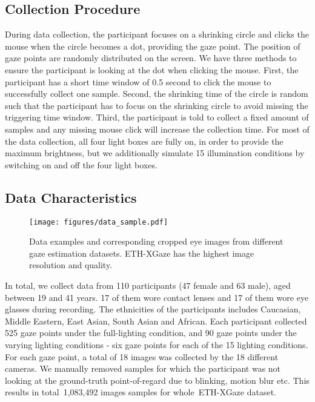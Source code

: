 \documentclass[runningheads]{llncs}
\newcommand{\datasetname}{ETH-XGaze\xspace}
\newcommand{\numsample}{1,083,492\xspace}
\begin{document}
\subsection{Collection Procedure}
During data collection, the participant focuses on a shrinking circle and clicks the mouse when the circle becomes a dot, providing the gaze point.
The position of gaze points are randomly distributed on the screen.
We have three methods to ensure the participant is looking at the dot when clicking the mouse.
First, the participant has a short time window of 0.5 second to click the mouse to successfully collect one sample.
Second, the shrinking time of the circle is random such that the participant has to focus on the shrinking circle to avoid missing the triggering time window.
Third, the participant is told to collect a fixed amount of samples and any missing mouse click will increase the collection time.
For most of the data collection, all four light boxes are fully on, in order to provide the maximum brightness, but we additionally simulate 15 illumination conditions by switching on and off the four light boxes.

\subsection{Data Characteristics}

\begin{figure}[t]
    \centering
    \texttt{[image: figures/data\_sample.pdf]}
    \caption{Data examples and corresponding cropped eye images from different gaze estimation datasets. \datasetname has the highest image resolution and quality.}
    \label{fig:data_sample}
\end{figure}

In total, we collect data from 110 participants (47 female and 63 male), aged between 19 and 41 years.
17 of them wore contact lenses and 17 of them wore eye glasses during recording.
The ethnicities of the participants includes Caucasian, Middle Eastern, East Asian, South Asian and African.
Each participant collected 525 gaze points under the full-lighting condition, and 90 gaze points under the varying lighting conditions - six gaze points for each of the 15 lighting conditions.
For each gaze point, a total of 18 images was collected by the 18 different cameras.
We manually removed samples for which the participant was not looking at the ground-truth point-of-regard due to  blinking, motion blur etc.
This results in total~\numsample images samples for whole~\datasetname dataset.
\end{document}
